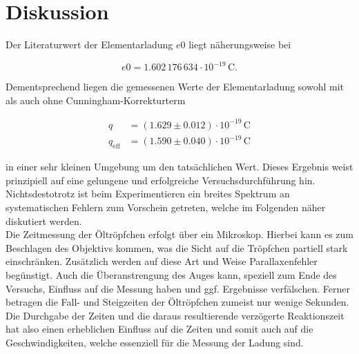 


\section{Diskussion}
\label{sec:Diskussion}

Der Literaturwert \cite{Elementarladung} der Elementarladung $e0$ liegt näherungsweise bei 

\begin{equation*}
    e0 = 1.602\,176\,634\cdot{}10^{-19}\,\unit{\coulomb}.
\end{equation*}

\noindent Dementsprechend liegen die gemessenen Werte der Elementarladung sowohl mit als auch ohne Cunningham-Korrekturterm 

\begin{align*}
    q            &= \left(1.629\pm0.012\right)\cdot10^{-19}\,\unit{\coulomb} \\
    q_\text{eff} &= \left(1.590 \pm0.040\right)\cdot10^{-19}\,\unit{\coulomb} 
\end{align*}

\noindent in einer sehr kleinen Umgebung um den tatsächlichen Wert. Dieses Ergebnis weist prinzipiell auf eine gelungene und 
erfolgreiche Versuchsdurchführung hin. Nichtsdestotrotz ist beim Experimentieren ein breites Spektrum an systematischen 
Fehlern zum Vorschein getreten, welche im Folgenden näher diskutiert werden.\\

\noindent Die Zeitmessung der Öltröpfchen erfolgt über ein Mikroskop. Hierbei kann es zum Beschlagen des Objektivs 
kommen, was die Sicht auf die Tröpfchen partiell stark einschränken. Zusätzlich werden auf diese Art und Weise 
Parallaxenfehler begünstigt. Auch die Überanstrengung des Auges kann, speziell zum Ende des Versuchs, Einfluss auf die 
Messung haben und ggf. Ergebnisse verfälschen. Ferner betragen die Fall- und Steigzeiten der Öltröpfchen zumeist nur 
wenige Sekunden. Die Durchgabe der Zeiten und die daraus resultierende verzögerte Reaktionszeit hat also einen erheblichen 
Einfluss auf die Zeiten und somit auch auf die Geschwindigkeiten, welche essenziell für die Messung der Ladung sind.\\

